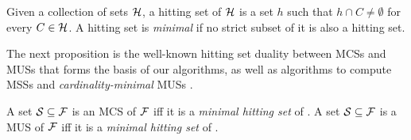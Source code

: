 \begin{definition}\label{def:minimal-hs}
    Given a collection of sets $\mathcal{H}$, a hitting set of $\mathcal{H}$ is a set $h$ such that  $h \cap C \neq \emptyset$ for every $C \in \mathcal{H}$. A hitting set is \emph{minimal} if no strict subset of it is also a hitting set.
\end{definition}



The next proposition is the well-known hitting set duality \cite{DBLP:journals/jar/LiffitonS08,ai/Reiter87}  between MCSs and MUSs that forms the basis of our algorithms, as well as algorithms to compute MSSs \cite{DBLP:conf/sat/DaviesB13} and \emph{cardinality-minimal} MUSs \cite{ignatiev2015smallest}.

\begin{proposition}\label{prop:MCS-MUS-hittingset}
%     
    A set  $\mathcal{S} \subseteq \mathcal{F} $ is an MCS of $ \mathcal{F} $ iff  it is a \emph{minimal hitting set} of \muses{\formula}.
% 
    A set  $\mathcal{S} \subseteq \mathcal{F} $ is a MUS of $ \mathcal{F} $ iff  it is a \emph{minimal hitting set} of \mcses{\formula}.
\end{proposition}
 


